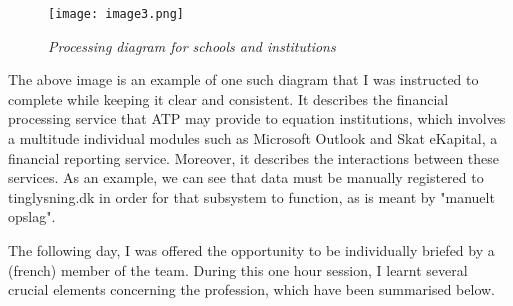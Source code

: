 \begin{figure}[H]
    \centering
        \texttt{[image: image3.png]}
        \caption*{\textit{Processing diagram for schools and institutions}}
\end{figure}

The above image is an example of one such diagram that I was instructed to
complete while keeping it clear and consistent. It describes the financial
processing service that ATP may provide to equation institutions, which involves
a multitude individual modules such as Microsoft Outlook and Skat eKapital, a
financial reporting service. Moreover, it describes the interactions between
these services. As an example, we can see that data must be manually registered
to tinglysning.dk in order for that subsystem to function, as is meant by
"manuelt opslag".

The following day, I was offered the opportunity to be individually briefed by a
(french) member of the team. During this one hour session, I learnt several
crucial elements concerning the profession, which have been summarised below.

